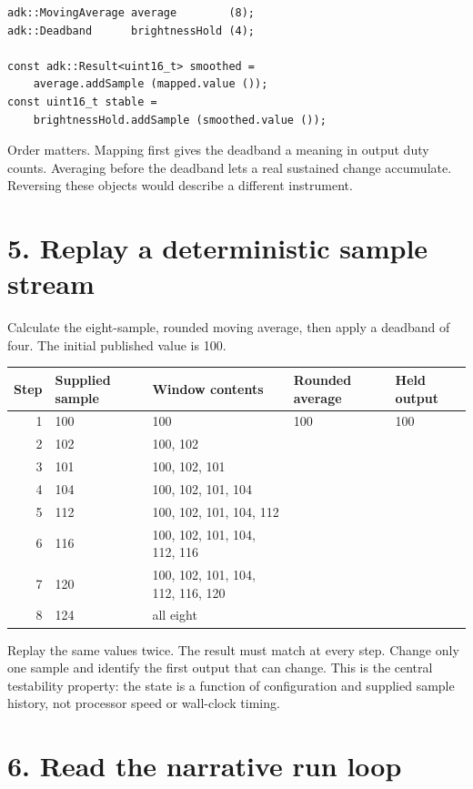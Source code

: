 \documentclass[11pt]{article}
\begin{document}
\begin{lstlisting}[style=adkcpp]
adk::MovingAverage average        (8);
adk::Deadband      brightnessHold (4);

const adk::Result<uint16_t> smoothed =
    average.addSample (mapped.value ());
const uint16_t stable =
    brightnessHold.addSample (smoothed.value ());
\end{lstlisting}

Order matters. Mapping first gives the deadband a meaning in output duty
counts. Averaging before the deadband lets a real sustained change accumulate.
Reversing these objects would describe a different instrument.

\section*{5. Replay a deterministic sample stream}

Calculate the eight-sample, rounded moving average, then apply a deadband of
four. The initial published value is 100.

\begin{center}
\begin{tabularx}{0.96\linewidth}{@{}rXXXX@{}}
\toprule
Step & Supplied sample & Window contents & Rounded average & Held output\\
\midrule
1 & 100 & 100 & 100 & 100\\
2 & 102 & 100, 102 & &\\
3 & 101 & 100, 102, 101 & &\\
4 & 104 & 100, 102, 101, 104 & &\\
5 & 112 & 100, 102, 101, 104, 112 & &\\
6 & 116 & 100, 102, 101, 104, 112, 116 & &\\
7 & 120 & 100, 102, 101, 104, 112, 116, 120 & &\\
8 & 124 & all eight & &\\
\bottomrule
\end{tabularx}
\end{center}

Replay the same values twice. The result must match at every step. Change only
one sample and identify the first output that can change. This is the central
testability property: the state is a function of configuration and supplied
sample history, not processor speed or wall-clock timing.

\section*{6. Read the narrative run loop}
\end{document}
